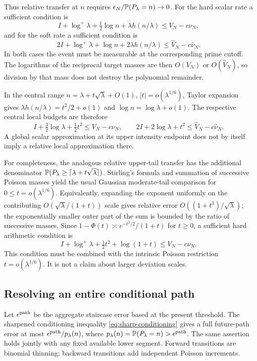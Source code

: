Thus relative transfer at $n$ requires
$\epsilon_N/\mathbb P(P_\lambda=n)\to0$. For the hard scalar rate a sufficient
condition is
\[
 I+\log^+\lambda+\tfrac12\log n+\lambda h(n/\lambda)
                  \le V_N-c\nu_N,
\]
and for the soft rate a sufficient condition is
\[
 2I+\log^+\lambda+\log n+2\lambda h(n/\lambda)
                  \le\widehat V_N-c\widehat\nu_N.
\]
In both cases the event must be measurable at the corresponding prime
cutoff. The logarithms of the reciprocal target masses are then
$O(V_N)$ or $O(\widehat V_N)$, so division by that mass does not destroy
the polynomial remainder.

In the central range
$n=\lambda+t\sqrt\lambda+O(1)$, $|t|=o(\lambda^{1/6})$,
Taylor expansion gives
$\lambda h(n/\lambda)=t^2/2+o(1)$ and $\log n=\log\lambda+o(1)$.
The respective central local budgets are therefore
\[
 I+\tfrac32\log\lambda+\tfrac12t^2\le V_N-c\nu_N,
 \qquad
 2I+2\log\lambda+t^2\le\widehat V_N-c\widehat\nu_N.
\]
A global scalar approximation at its upper intensity endpoint does not
by itself imply a relative local approximation there.

For completeness, the analogous relative upper-tail transfer has the
additional denominator $\mathbb P(P_\lambda\ge\lceil\lambda+t\sqrt\lambda\rceil)$.
Stirling's formula and summation of successive Poisson masses yield the
usual Gaussian moderate-tail comparison for
$0\le t=o(\lambda^{1/6})$. Equivalently, expanding the exponent uniformly
on the contributing $O(\sqrt\lambda/(1+t))$ scale gives relative error
$O((1+t^3)/\sqrt\lambda)$; the exponentially smaller outer part of the
sum is bounded by the ratio of successive masses. Since
$1-\Phi(t)\asymp e^{-t^2/2}/(1+t)$ for $t\ge0$, a sufficient hard
arithmetic condition is
\[
 I+\log^+\lambda+\tfrac12t^2+\log(1+t)\le V_N-c\nu_N.
\]
This condition must be combined with the intrinsic Poisson restriction
$t=o(\lambda^{1/6})$. It is not a claim about larger deviation scales.

\subsection{Resolving an entire conditional path}
Let $\epsilon^{\rm path}$ be the aggregate staircase error based at the
present threshold. The sharpened conditioning inequality
\eqref{eq:sharp-conditioning} gives a full future-path error at most
$\epsilon^{\rm path}/p_\lambda(n)$, where
$p_\lambda(n)=\mathbb P(P_\lambda=n)>\epsilon^{\rm path}$.
The same assertion holds jointly with any fixed available lower segment.
Forward transitions are binomial thinning; backward transitions add
independent Poisson increments.

